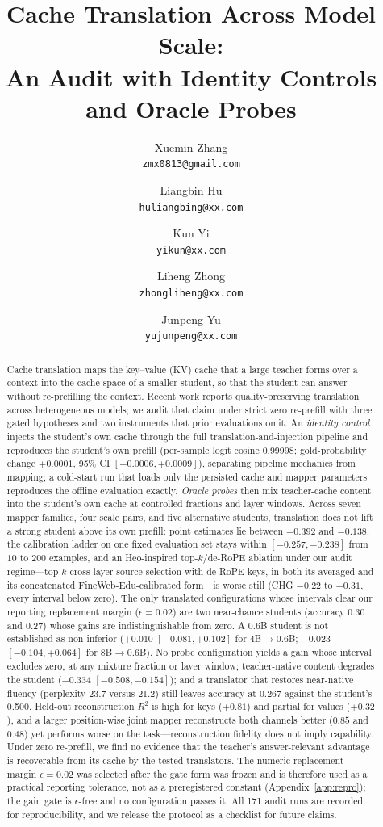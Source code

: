 \documentclass[10pt]{article}
\title{Cache Translation Across Model Scale:\\
An Audit with Identity Controls and Oracle Probes}
\author[1]{Xuemin Zhang\\\texttt{\small zmx0813@gmail.com}}
\author[1]{Liangbin Hu\\\texttt{\small huliangbing@xx.com}}
\author[1]{Kun Yi\\\texttt{\small yikun@xx.com}}
\author[1]{Liheng Zhong\\\texttt{\small zhongliheng@xx.com}}
\author[1]{Junpeng Yu\\\texttt{\small yujunpeng@xx.com}}
\affil[1]{CETC}
\date{}
\begin{document}
\maketitle

\begin{abstract}
Cache translation maps the key--value (KV) cache that a large teacher forms
over a context into the cache space of a smaller student, so that the student
can answer without re-prefilling the context. Recent work reports
quality-preserving translation across heterogeneous models; we audit that claim
under strict zero re-prefill with three gated hypotheses and two instruments
that prior evaluations omit. An \emph{identity control} injects the student's
own cache through the full translation-and-injection pipeline and reproduces
the student's own prefill (per-sample logit cosine $0.99998$; gold-probability
change $+0.0001$, 95\% CI $[-0.0006, +0.0009]$), separating pipeline mechanics
from mapping; a cold-start run that loads only the persisted cache and mapper
parameters reproduces the offline evaluation exactly. \emph{Oracle probes} then mix teacher-cache content into the
student's own cache at controlled fractions and layer windows. Across seven
mapper families, four scale pairs, and five alternative students, translation
does not lift a strong student above its own
prefill: point estimates lie between $-0.392$ and $-0.138$, the calibration
ladder on one fixed evaluation set stays within $[-0.257, -0.238]$ from $10$ to
$200$ examples, and an Heo-inspired top-$k$/de-RoPE ablation under our audit regime---top-$k$ cross-layer source selection with
de-RoPE keys, in both its averaged and its concatenated FineWeb-Edu-calibrated form---is worse still (CHG $-0.22$ to $-0.31$, every interval below zero).
The only translated configurations whose intervals clear our reporting replacement margin ($\epsilon{=}0.02$) are two near-chance students (accuracy
$0.30$ and $0.27$) whose gains are indistinguishable from zero. A 0.6B student is not established as
non-inferior ($+0.010$ $[-0.081, +0.102]$ for 4B$\to$0.6B; $-0.023$
$[-0.104, +0.064]$ for 8B$\to$0.6B). No probe configuration yields a gain whose
interval excludes zero, at any mixture fraction or layer window; teacher-native
content degrades the student ($-0.334$ $[-0.508, -0.154]$); and a translator
that restores near-native fluency (perplexity 23.7 versus 21.2) still leaves
accuracy at 0.267 against the student's 0.500. Held-out reconstruction $R^2$ is
high for keys ($+0.81$) and partial for values ($+0.32$), and a larger
position-wise joint mapper reconstructs both channels better ($0.85$ and $0.48$)
yet performs worse on the task---reconstruction fidelity does not imply
capability. Under zero
re-prefill, we find no evidence that the teacher's answer-relevant advantage is
recoverable from its cache by the tested translators. The numeric replacement margin $\epsilon{=}0.02$ was selected after the gate form was frozen and is therefore used as a practical reporting tolerance, not as a preregistered constant (Appendix~\ref{app:repro}); the gain gate is $\epsilon$-free and no configuration passes it. All 171 audit runs are
recorded for reproducibility, and we release the protocol as a checklist for
future claims.
\end{abstract}
\end{document}
